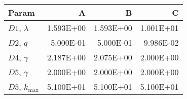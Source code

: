 \begin{tabular}{lrrr}
\toprule
 Param            &         A &         B &         C \\
\midrule
 $D1$, $\lambda$  & \num{1.593E+00} & \num{1.593E+00} & \num{1.001E+01} \\
 $D2$, $q$        & \num{5.000E-01} & \num{5.000E-01} & \num{9.986E-02} \\
 $D4$, $\gamma$   & \num{2.187E+00} & \num{2.075E+00} & \num{2.000E+00} \\
 $D5$, $\gamma$   & \num{2.000E+00} & \num{2.000E+00} & \num{2.000E+00} \\
 $D5$, $k_{\max}$ & \num{5.100E+01} & \num{5.100E+01} & \num{5.100E+01} \\
\bottomrule
\end{tabular}
